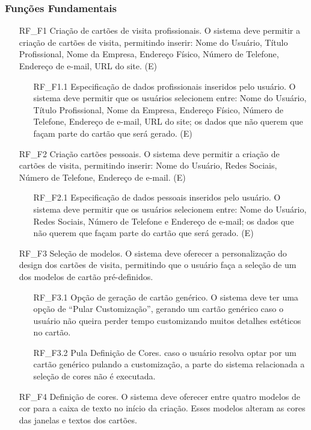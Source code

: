 \subsubsection{Funções Fundamentais}
\begin{itemize}
    \item[RF\_F1] Criação de cartões de visita profissionais. O sistema deve permitir a criação de cartões de visita, permitindo inserir: Nome do Usuário, Título Profissional, Nome da Empresa, Endereço Físico, Número de Telefone, Endereço de e-mail, URL do site. (E)
    \begin{itemize}
        \item[RF\_F1.1] Especificação de dados profissionais inseridos pelo usuário. O sistema deve permitir que os usuários selecionem entre: Nome do Usuário, Título Profissional, Nome da Empresa, Endereço Físico, Número de Telefone, Endereço de e-mail, URL do site; os dados que não querem que façam parte do cartão que será gerado. (E)
    \end{itemize}
    \item[RF\_F2] Criação cartões pessoais. O sistema deve permitir a criação de cartões de visita, permitindo inserir: Nome do Usuário, Redes Sociais, Número de Telefone, Endereço de e-mail. (E)
    \begin{itemize}
        \item[RF\_F2.1] Especificação de dados pessoais inseridos pelo usuário. O sistema deve permitir que os usuários selecionem entre: Nome do Usuário, Redes Sociais, Número de Telefone e Endereço de e-mail; os dados que não querem que façam parte do cartão que será gerado. (E)
    \end{itemize}
    \item[RF\_F3] Seleção de modelos. O sistema deve oferecer a personalização do design dos cartões de visita, permitindo que o usuário faça a seleção de um dos modelos de cartão pré-definidos.
    \begin{itemize}
        \item[RF\_F3.1] Opção de geração de cartão genérico. O sistema deve ter uma opção de “Pular Customização”, gerando um cartão genérico caso o usuário não queira perder tempo customizando muitos detalhes estéticos no cartão.
        \item[RF\_F3.2] Pula Definição de Cores. caso o usuário resolva optar por um cartão genérico pulando a customização, a parte do sistema relacionada a seleção de cores não é executada.
    \end{itemize}
    \item[RF\_F4] Definição de cores. O sistema deve oferecer entre quatro modelos de cor para a caixa de texto no início da criação. Esses modelos alteram as cores das janelas e textos dos cartões.

\end{itemize}
